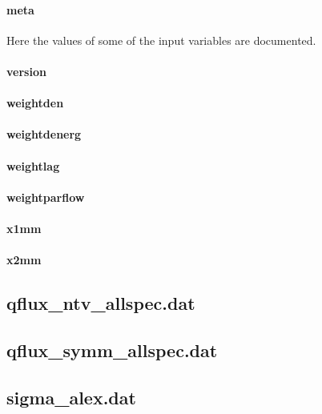 \paragraph{meta}
Here the values of some of the input variables are documented.

\paragraph{version}

\paragraph{weightden}

\paragraph{weightdenerg}

\paragraph{weightlag}

\paragraph{weightparflow}

\paragraph{x1mm}

\paragraph{x2mm}

\subsection{qflux\_ntv\_allspec.dat}

\subsection{qflux\_symm\_allspec.dat}

\subsection{sigma\_alex.dat}

